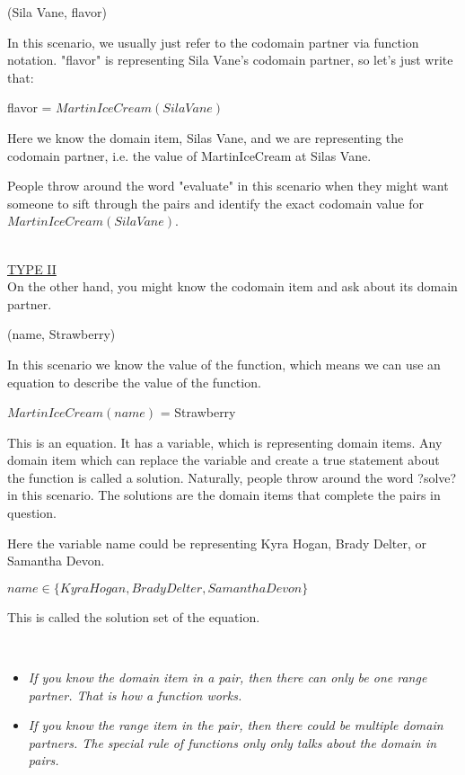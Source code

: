 \documentclass{ximera}
\begin{document}
\begin{center}
(Sila Vane, flavor)
\end{center}


In this scenario, we usually just refer to the codomain partner via function notation. "flavor" is representing Sila Vane's codomain partner, so let's just write that:
\begin{center}
flavor = $MartinIceCream(Sila Vane)$
\end{center}

Here we know the domain item, Silas Vane, and we are representing the codomain partner, i.e. the value of MartinIceCream at Silas Vane.  

People throw around the word "evaluate" in this scenario when they might want someone to sift through the pairs and identify the exact codomain value for $MartinIceCream(Sila Vane)$.

\quad \\
\underline{TYPE II} \\

On the other hand, you might know the codomain item and ask about its domain partner.
\begin{center}
(name, Strawberry)
\end{center}

In this scenario we know the value of the function, which means we can use an equation to describe the value of the function.
\begin{center}
$MartinIceCream(name)$ = Strawberry 
\end{center}


This is an equation.  It has a variable, which is representing domain items. Any domain item which can replace the variable and create a true statement about the function is called a solution.  Naturally, people throw around the word ?solve? in this scenario. The solutions are the domain items that complete the pairs in question.

Here the variable name could be representing Kyra Hogan, Brady Delter, or Samantha Devon.


$name \in \{ Kyra Hogan, Brady Delter, Samantha Devon \}$

This is called the solution set of the equation.


\quad \\

\begin{itemize}
\item \textit{If you know the domain item in a pair, then there can only be one range partner.  That is how a function works.}

\item \textit{If you know the range item in the pair, then there could be multiple domain partners. The special rule of functions only only talks about the domain in pairs.}
\end{itemize}
\end{document}
